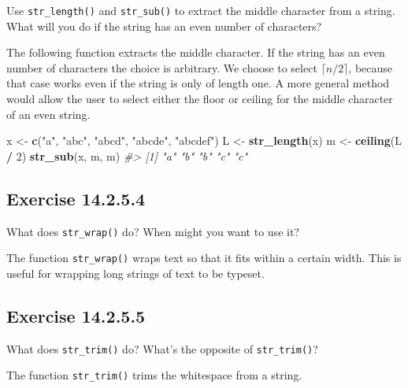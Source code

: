 \documentclass[]{book}
\newenvironment{Shaded}{\begin{snugshade}}{\end{snugshade}}
\newcommand{\CommentTok}[1]{\textcolor[rgb]{0.56,0.35,0.01}{\textit{#1}}}
\newcommand{\DecValTok}[1]{\textcolor[rgb]{0.00,0.00,0.81}{#1}}
\newcommand{\KeywordTok}[1]{\textcolor[rgb]{0.13,0.29,0.53}{\textbf{#1}}}
\newcommand{\NormalTok}[1]{#1}
\newcommand{\OperatorTok}[1]{\textcolor[rgb]{0.81,0.36,0.00}{\textbf{#1}}}
\newcommand{\StringTok}[1]{\textcolor[rgb]{0.31,0.60,0.02}{#1}}
\theoremstyle{plain}
\theoremstyle{remark}
\begin{document}
Use \texttt{str\_length()} and \texttt{str\_sub()} to extract the middle character from a string. What will you do if the string has an even number of characters?

The following function extracts the middle character. If the string has an even number of characters the choice is arbitrary.
We choose to select \(\lceil n / 2 \rceil\), because that case works even if the string is only of length one.
A more general method would allow the user to select either the floor or ceiling for the middle character of an even string.

\begin{Shaded}
\begin{Highlighting}[]
\NormalTok{x <-}\StringTok{ }\KeywordTok{c}\NormalTok{(}\StringTok{"a"}\NormalTok{, }\StringTok{"abc"}\NormalTok{, }\StringTok{"abcd"}\NormalTok{, }\StringTok{"abcde"}\NormalTok{, }\StringTok{"abcdef"}\NormalTok{)}
\NormalTok{L <-}\StringTok{ }\KeywordTok{str_length}\NormalTok{(x)}
\NormalTok{m <-}\StringTok{ }\KeywordTok{ceiling}\NormalTok{(L }\OperatorTok{/}\StringTok{ }\DecValTok{2}\NormalTok{)}
\KeywordTok{str_sub}\NormalTok{(x, m, m)}
\CommentTok{#> [1] "a" "b" "b" "c" "c"}
\end{Highlighting}
\end{Shaded}

\hypertarget{exercise-14.2.5.4}{%
\subsection*{\texorpdfstring{Exercise {14.2.5.4}}{Exercise 14.2.5.4}}\label{exercise-14.2.5.4}}

What does \texttt{str\_wrap()} do? When might you want to use it?

The function \texttt{str\_wrap()} wraps text so that it fits within a certain width.
This is useful for wrapping long strings of text to be typeset.

\hypertarget{exercise-14.2.5.5}{%
\subsection*{\texorpdfstring{Exercise {14.2.5.5}}{Exercise 14.2.5.5}}\label{exercise-14.2.5.5}}

What does \texttt{str\_trim()} do? What's the opposite of \texttt{str\_trim()}?

The function \texttt{str\_trim()} trims the whitespace from a string.
\end{document}
